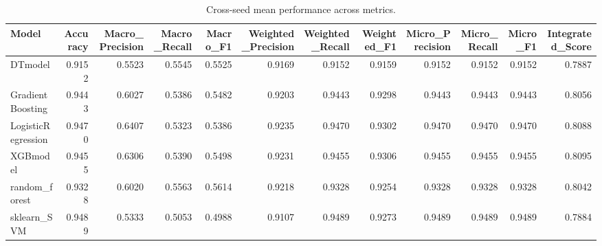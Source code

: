 \begin{table}[t]
\centering
\begin{tabular}{lrrrrrrrrrrr}
\toprule
Model & Accuracy & Macro_Precision & Macro_Recall & Macro_F1 & Weighted_Precision & Weighted_Recall & Weighted_F1 & Micro_Precision & Micro_Recall & Micro_F1 & Integrated_Score \\
\midrule
DTmodel & 0.9152 & 0.5523 & 0.5545 & 0.5525 & 0.9169 & 0.9152 & 0.9159 & 0.9152 & 0.9152 & 0.9152 & 0.7887 \\
GradientBoosting & 0.9443 & 0.6027 & 0.5386 & 0.5482 & 0.9203 & 0.9443 & 0.9298 & 0.9443 & 0.9443 & 0.9443 & 0.8056 \\
LogisticRegression & 0.9470 & 0.6407 & 0.5323 & 0.5386 & 0.9235 & 0.9470 & 0.9302 & 0.9470 & 0.9470 & 0.9470 & 0.8088 \\
XGBmodel & 0.9455 & 0.6306 & 0.5390 & 0.5498 & 0.9231 & 0.9455 & 0.9306 & 0.9455 & 0.9455 & 0.9455 & 0.8095 \\
random_forest & 0.9328 & 0.6020 & 0.5563 & 0.5614 & 0.9218 & 0.9328 & 0.9254 & 0.9328 & 0.9328 & 0.9328 & 0.8042 \\
sklearn_SVM & 0.9489 & 0.5333 & 0.5053 & 0.4988 & 0.9107 & 0.9489 & 0.9273 & 0.9489 & 0.9489 & 0.9489 & 0.7884 \\
\bottomrule
\end{tabular}
\caption{Cross-seed mean performance across metrics.}
\label{tab:cross_seed_mean}
\end{table}